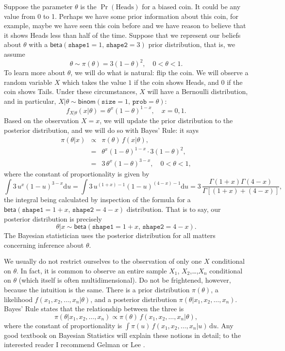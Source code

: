 \documentclass[captions=tableheading]{scrbook}
\begin{document}
\begin{example}
Suppose the parameter \(\theta\) is the \(\Pr(\mbox{Heads})\) for a biased coin. It could be any value from 0 to 1. Perhaps we have some prior information about this coin, for example, maybe we have seen this coin before and we have reason to believe that it shows Heads less than half of the time. Suppose that we represent our beliefs about \(\theta\) with a \(\mathsf{beta}(\mathtt{shape1}=1,\,\mathtt{shape2}=3)\) prior distribution, that is, we assume 
\[
\theta\sim\pi(\theta)=3(1-\theta)^{2},\quad0<\theta<1.
\]
To learn more about \(\theta\), we will do what is natural: flip the coin. We will observe a random variable \(X\) which takes the value \(1\) if the coin shows Heads, and 0 if the coin shows Tails. Under these circumstances, \(X\) will have a Bernoulli distribution, and in particular, \(X|\theta\sim\mathsf{binom}(\mathtt{size}=1,\,\mathtt{prob}=\theta)\):
\[ 
f_{X|\theta}(x|\theta)=\theta^{x}(1-\theta)^{1-x},\quad x=0,1.
\]
Based on the observation \(X=x\), we will update the prior distribution to the posterior distribution, and we will do so with Bayes' Rule: it says
\begin{eqnarray*}
\pi(\theta|x) & \propto & \pi(\theta)\, f(x|\theta),\\
 & = & \theta^{x}(1-\theta)^{1-x}\cdot3(1-\theta)^{2},\\
 & = & 3\,\theta^{x}(1-\theta)^{3-x},\quad0<\theta<1,
\end{eqnarray*}
where the constant of proportionality is given by
\[
\int3\, u^{x}(1-u)^{3-x}\mathrm{d} u=\int3\, u^{(1+x)-1}(1-u)^{(4-x)-1}\mathrm{d} u=3\,\frac{\Gamma(1+x)\Gamma(4-x)}{\Gamma[(1+x)+(4-x)]},
\]
the integral being calculated by inspection of the formula for a \(\mathsf{beta}(\mathtt{shape1}=1+x,\,\mathtt{shape2}=4-x)\) distribution. That is to say, our posterior distribution is precisely
\[
\theta|x\sim\mathsf{beta}(\mathtt{shape1}=1+x,\,\mathtt{shape2}=4-x).
\]
The Bayesian statistician uses the posterior distribution for all matters concerning inference about \(\theta\).

\end{example}

\begin{rem}
We usually do not restrict ourselves to the observation of only one \(X\) conditional on \(\theta\). In fact, it is common to observe an entire sample \(X_{1}\), \(X_{2}\),\ldots{},\(X_{n}\) conditional on \(\theta\) (which itself is often multidimensional). Do not be frightened, however, because the intuition is the same. There is a prior distribution \(\pi(\theta)\), a likelihood \(f(x_{1},x_{2},\ldots,x_{n}|\theta)\), and a posterior distribution \(\pi(\theta|x_{1},x_{2},\ldots,x_{n})\). Bayes' Rule states that the relationship between the three is
\[
\pi(\theta|x_{1},x_{2},\ldots,x_{n})\propto\pi(\theta)\, f(x_{1},x_{2},\ldots,x_{n}|\theta),
\]
where the constant of proportionality is \(\int\pi(u)\, f(x_{1},x_{2},\ldots,x_{n}|u)\,\mathrm{d} u\). Any good textbook on Bayesian Statistics will explain these notions in detail; to the interested reader I recommend Gelman \cite{Gelman2004} or Lee \cite{Lee1997}.
\end{rem}
\end{document}
